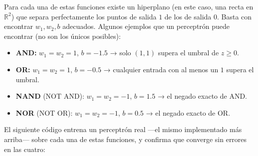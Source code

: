 \documentclass[
  letterpaper,
  DIV=11,
  numbers=noendperiod]{scrartcl}
\providecommand{\tightlist}{%
  \setlength{\itemsep}{0pt}\setlength{\parskip}{0pt}}
\begin{document}
Para cada una de estas funciones existe un hiperplano (en este caso, una
recta en \(\mathbb{R}^2\)) que separa perfectamente los puntos de salida
\(1\) de los de salida \(0\). Basta con encontrar \(w_1, w_2, b\)
adecuados. Algunos ejemplos que un perceptrón puede encontrar (no son
los únicos posibles):

\begin{itemize}
\tightlist
\item
  \textbf{AND:} \(w_1 = w_2 = 1\), \(b = -1.5\) → solo \((1,1)\) supera
  el umbral de \(z \geq 0\).
\item
  \textbf{OR:} \(w_1 = w_2 = 1\), \(b = -0.5\) → cualquier entrada con
  al menos un \(1\) supera el umbral.
\item
  \textbf{NAND} (NOT AND): \(w_1 = w_2 = -1\), \(b = 1.5\) → el negado
  exacto de AND.
\item
  \textbf{NOR} (NOT OR): \(w_1 = w_2 = -1\), \(b = 0.5\) → el negado
  exacto de OR.
\end{itemize}

El siguiente código entrena un perceptrón real ---el mismo implementado
más arriba--- sobre cada una de estas funciones, y confirma que converge
sin errores en las cuatro:
\end{document}
